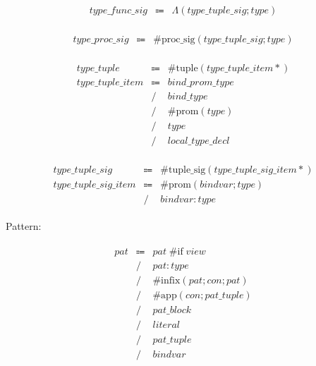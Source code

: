 \begin{align*}
    \begin{array}{rcll}
        \mathit{type\_func\_sig}
        &\Coloneq &\Lambda(\mathit{type\_tuple\_sig}; \mathit{type})
    \end{array}
\end{align*}

\begin{align*}
    \begin{array}{rcll}
        \mathit{type\_proc\_sig}
        &\Coloneq &\mathrm{\#proc\_sig}(\mathit{type\_tuple\_sig}; \mathit{type})
    \end{array}
\end{align*}

\begin{align*}
    \begin{array}{rcll}
        \mathit{type\_tuple}
        &\Coloneq &\mathrm{\#tuple}(\mathit{type\_tuple\_item}{*}) \\
        \mathit{type\_tuple\_item}
        &\Coloneq &\mathit{bind\_prom\_type} \\
        &\mathrel{/} &\mathit{bind\_type} \\
        &\mathrel{/} &\mathrm{\#prom}(\mathit{type}) \\
        &\mathrel{/} &\mathit{type} \\
        &\mathrel{/} &\mathit{local\_type\_decl}
    \end{array}
\end{align*}

\begin{align*}
    \begin{array}{rcll}
        \mathit{type\_tuple\_sig}
        &\Coloneq &\mathrm{\#tuple\_sig}(\mathit{type\_tuple\_sig\_item}{*}) \\
        \mathit{type\_tuple\_sig\_item}
        &\Coloneq &\mathrm{\#prom}(\mathit{bindvar}; \mathit{type}) \\
        &\mathrel{/} &\mathit{bindvar}: \mathit{type}
    \end{array}
\end{align*}

Pattern:

\begin{align*}
    \begin{array}{rcll}
        \mathit{pat}
        &\Coloneq &\mathit{pat}\; \mathrm{\#if}\; \mathit{view} \\
        &\mathrel{/} &\mathit{pat}: \mathit{type} \\
        &\mathrel{/} &\mathrm{\#infix}(\mathit{pat}; \mathit{con}; \mathit{pat}) \\
        &\mathrel{/} &\mathrm{\#app}(\mathit{con}; \mathit{pat\_tuple}) \\
        &\mathrel{/} &\mathit{pat\_block} \\
        &\mathrel{/} &\mathit{literal} \\
        &\mathrel{/} &\mathit{pat\_tuple} \\
        &\mathrel{/} &\mathit{bindvar}
    \end{array}
\end{align*}

